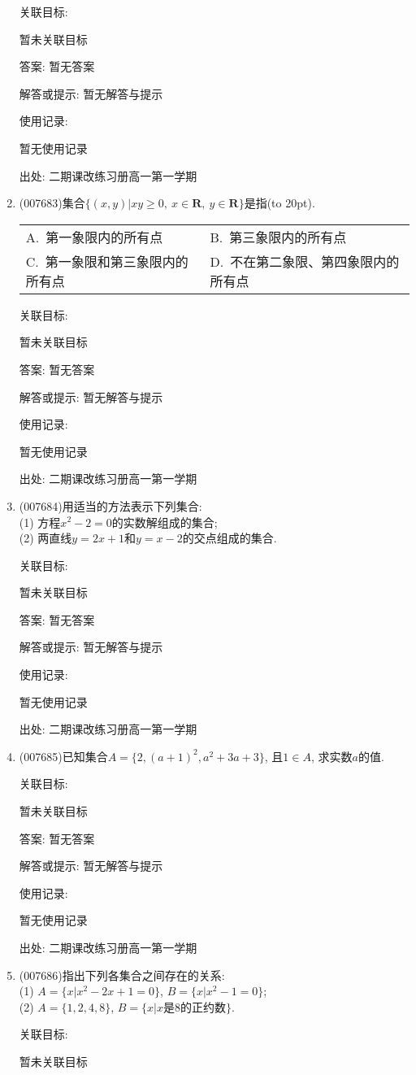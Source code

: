 \documentclass[10pt,a4paper]{article}
\newcommand{\bracket}[1]{(\hbox to #1pt{})}
\newcommand{\twoch}[4]{\par\begin{tabular}{p{.46\textwidth}p{.46\textwidth}}
A.~#1& B.~#2\\
C.~#3& D.~#4
\end{tabular}}
\begin{document}
\begin{enumerate}[1.]
关联目标:

暂未关联目标

答案: 暂无答案

解答或提示: 暂无解答与提示

使用记录:

暂无使用记录


出处: 二期课改练习册高一第一学期
\item { (007683)}集合$\{(x,y)|xy\ge 0, \ x\in \mathbf{R}, \ y\in \mathbf{R}\}$是指\bracket{20}.
\twoch{第一象限内的所有点}{第三象限内的所有点}{第一象限和第三象限内的所有点}{不在第二象限、第四象限内的所有点}


关联目标:

暂未关联目标

答案: 暂无答案

解答或提示: 暂无解答与提示

使用记录:

暂无使用记录


出处: 二期课改练习册高一第一学期
\item { (007684)}用适当的方法表示下列集合:\\
(1) 方程$x^2-2=0$的实数解组成的集合;\\
(2) 两直线$y=2x+1$和$y=x-2$的交点组成的集合.


关联目标:

暂未关联目标

答案: 暂无答案

解答或提示: 暂无解答与提示

使用记录:

暂无使用记录


出处: 二期课改练习册高一第一学期
\item { (007685)}已知集合$A=\{2,(a+1)^2,a^2+3a+3\}$, 且$1\in A$, 求实数$a$的值.


关联目标:

暂未关联目标

答案: 暂无答案

解答或提示: 暂无解答与提示

使用记录:

暂无使用记录


出处: 二期课改练习册高一第一学期
\item { (007686)}指出下列各集合之间存在的关系:\\
(1) $A=\{x|x^2-2x+1=0\}$, $B=\{x|x^2-1=0\}$;\\
(2) $A=\{1,2,4,8\}$, $B=\{x|x\text{是}8\text{的正约数}\}$.


关联目标:

暂未关联目标


\end{enumerate}
\end{document}
